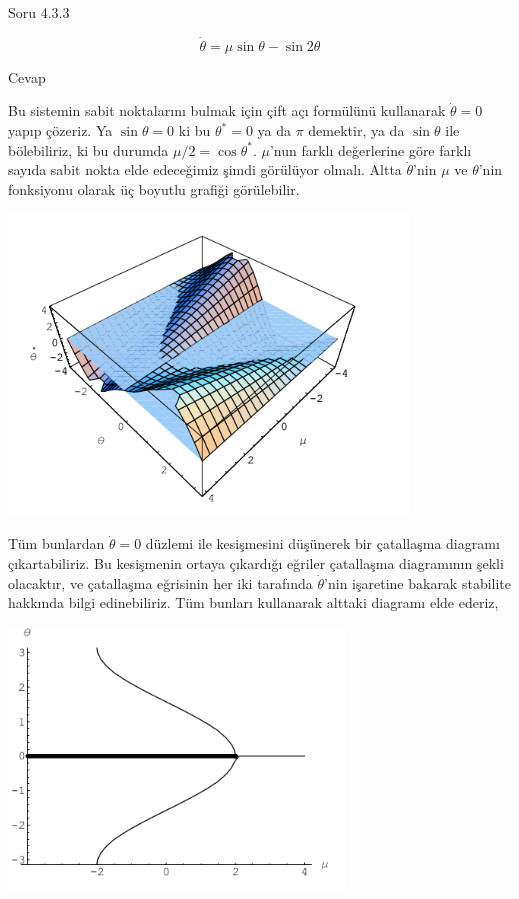 \documentclass[12pt,fleqn]{article}\usepackage{../../common}
\begin{document}
Soru 4.3.3

$$ \dot{\theta} = \mu \sin\theta - \sin 2\theta$$

Cevap

Bu sistemin sabit noktalarını bulmak için çift açı formülünü kullanarak
$\dot{\theta} = 0$ yapıp çözeriz. Ya $\sin \theta = 0$ ki bu $\theta^* = 0$ ya
da $\pi$ demektir, ya da $\sin\theta$ ile bölebiliriz, ki bu durumda $\mu/2 =
\cos\theta^*$. $\mu$'nun farklı değerlerine göre farklı sayıda sabit nokta elde
edeceğimiz şimdi görülüyor olmalı. Altta $\dot{\theta}$'nin $\mu$ ve
$\theta$'nin fonksiyonu olarak üç boyutlu grafiği görülebilir.

\includegraphics[height=8cm]{12_01.png}

Tüm bunlardan $\dot{\theta}=0$ düzlemi ile kesişmesini düşünerek bir çatallaşma
diagramı çıkartabiliriz. Bu kesişmenin ortaya çıkardığı eğriler çatallaşma
diagramının şekli olacaktır, ve çatallaşma eğrisinin her iki tarafında
$\dot{\theta}$'nin işaretine bakarak stabilite hakkında bilgi edinebiliriz. Tüm
bunları kullanarak alttaki diagramı elde ederiz, 

\includegraphics[height=7cm]{12_02.png}
\end{document}

